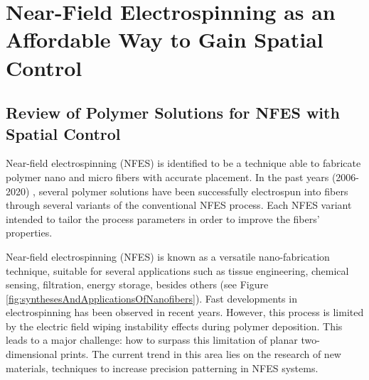 \chapter{Near-Field Electrospinning as an Affordable Way to Gain Spatial Control} %

\label{Chapter:2}

\section{Review of Polymer Solutions for NFES with Spatial Control}

Near-field electrospinning (NFES) is identified to be a technique able to fabricate polymer nano and micro fibers with accurate placement. \cite{He2017} In the past years (2006-2020) \cite{Helgeson2007,
  Yang2019,Fattahi2017,Shin2019,Wang2015,Parajuli2016,Zheng2010,Fuh2011,Dalton2015,
  Ru2014,Xue2014,Wang2017,Xu2014,Liu2013,Pan2014,Canton2014,Chakraborty2009,Gupta2007,
  He2018,Zhou2011,Chen2013,Williams2018,Choi2017,Pan2019,Lei2015,Lim2019,Park2020,
  Fuh2012,Flores2017,Chang2010,Xu2019,Zhang2019,Shin2018,Fuh2015,Nagle2019,Zheng2012,
  Kameoka2003a,Liu2014,E.King2019,Hochleitner2017,Madou2011,Jiang2018,Husain2016,
  ElectrospinTech2015,Brown2011,Kolan2018,Chang2011,Beachley2011,Camillo2013,Kameoka2003,
  Bu2012,Lee2012,Huang2015,Coppola2020,CisquellaSerra2019,Ruggieri2013,Hochleitner2014,
  Zhu2016,Brown2014,Chang2008,Sonntag2020,Kim2018,Deng2020,Han2019,George2020,Sun2006a,
  Pan2015,Shen2016,Strauss2019,Fuh2013,Sarkar2007,You2017,Wang2018a,Zheng2014,Song2015,
  GaofengZheng2010,Liu2015a,Min2013,Luo2016,Yousefi2019,Cardenas2017,Coppola2014}, several polymer solutions have been successfully electrospun into fibers through several variants of the conventional NFES process. Each NFES variant intended to tailor the process parameters in order to improve the fibers' properties. 

Near-field electrospinning (NFES) is known as a versatile nano-fabrication technique, suitable for several applications such as tissue engineering, chemical sensing, filtration, energy storage, besides others (see Figure \ref{fig:synthesesAndApplicationsOfNanofibers}). Fast developments in electrospinning has been observed in recent years. However, this process is limited by the electric field wiping instability effects during polymer deposition. This leads to a major challenge: how to surpass this limitation of planar two-dimensional prints. The current trend in this area lies on the research of new materials, techniques to increase precision patterning in NFES systems.


